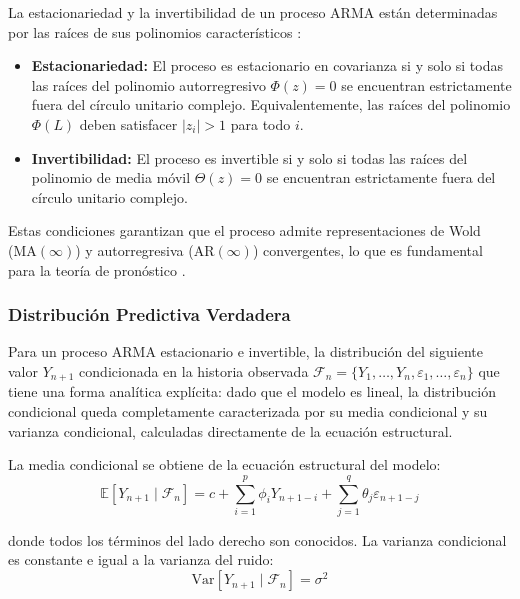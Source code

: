 La estacionariedad y la invertibilidad de un proceso ARMA están determinadas por las raíces de sus polinomios característicos \parencite{Hyndman2021FPP3}:

\begin{itemize}
\item \textbf{Estacionariedad:} El proceso es estacionario en covarianza si y solo si todas las raíces del polinomio autorregresivo $\Phi(z) = 0$ se encuentran estrictamente fuera del círculo unitario complejo. Equivalentemente, las raíces del polinomio $\Phi(L)$ deben satisfacer $|z_i| > 1$ para todo $i$.

\item \textbf{Invertibilidad:} El proceso es invertible si y solo si todas las raíces del polinomio de media móvil $\Theta(z) = 0$ se encuentran estrictamente fuera del círculo unitario complejo.
\end{itemize}

Estas condiciones garantizan que el proceso admite representaciones de Wold (MA$(\infty)$) y autorregresiva (AR$(\infty)$) convergentes, lo que es fundamental para la teoría de pronóstico \parencite{Arrieta2017}.

\subsubsection{Distribución Predictiva Verdadera}

Para un proceso ARMA estacionario e invertible, la distribución del siguiente valor $Y_{n+1}$ condicionada en la historia observada $\mathcal{F}_n = \{Y_1, \ldots, Y_n, \varepsilon_1, \ldots, \varepsilon_n\}$ que tiene una forma analítica explícita: dado que el modelo es lineal, la distribución condicional queda completamente caracterizada por su media condicional y su varianza condicional, calculadas directamente de la ecuación estructural.

La media condicional se obtiene de la ecuación estructural del modelo:
\begin{equation}
\mathbb{E}[Y_{n+1} \mid \mathcal{F}_n] = c + \sum_{i=1}^p \phi_i Y_{n+1-i} + \sum_{j=1}^q \theta_j \varepsilon_{n+1-j}
\label{eq:arma_conditional_mean}
\end{equation}

donde todos los términos del lado derecho son conocidos. La varianza condicional es constante e igual a la varianza del ruido:
\begin{equation}
\text{Var}[Y_{n+1} \mid \mathcal{F}_n] = \sigma^2
\label{eq:arma_conditional_variance}
\end{equation}

